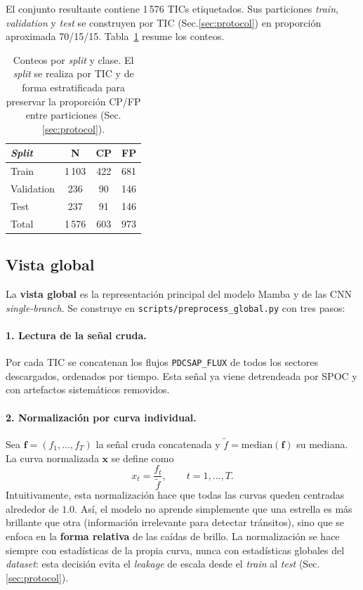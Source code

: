 \documentclass[11pt,a4paper]{article}
\begin{document}
El conjunto resultante contiene 1\,576 TICs etiquetados. Sus particiones
\textit{train}, \textit{validation} y \textit{test} se construyen por TIC
(Sec.\ref{sec:protocol}) en proporción aproximada 70/15/15.
Tabla~\ref{tab:dataset-counts} resume los conteos.

\begin{table}[H]
\centering
\caption{Conteos por \textit{split} y clase. El \textit{split} se
realiza por TIC y de forma estratificada para preservar la proporción
CP/FP entre particiones (Sec.\ref{sec:protocol}).}
\label{tab:dataset-counts}
\begin{tabular}{lccc}
\toprule
\textit{Split} & N & CP & FP \\
\midrule
Train      & 1\,103 & 422 & 681 \\
Validation & 236    & 90  & 146 \\
Test       & 237    & 91  & 146 \\
\midrule
Total      & 1\,576 & 603 & 973 \\
\bottomrule
\end{tabular}
\end{table}

\subsection{Vista global}
\label{subsec:global-view}

La \textbf{vista global} es la representación principal del modelo
Mamba y de las CNN \textit{single-branch}. Se construye en
\texttt{scripts/preprocess\_global.py} con tres pasos:

\paragraph{1. Lectura de la señal cruda.}
Por cada TIC se concatenan los flujos \texttt{PDCSAP\_FLUX} de todos
los sectores descargados, ordenados por tiempo. Esta señal ya viene
detrendeada por SPOC y con artefactos sistemáticos removidos.

\paragraph{2. Normalización por curva individual.}
Sea $\mathbf{f} = (f_1, \dots, f_T)$ la señal cruda concatenada y
$\tilde{f} = \mathrm{median}(\mathbf{f})$ su mediana. La curva
normalizada $\mathbf{x}$ se define como
\begin{equation}
  x_t = \frac{f_t}{\tilde{f}}, \qquad t = 1, \dots, T.
\label{eq:median-norm}
\end{equation}
Intuitivamente, esta normalización hace que todas las curvas queden
centradas alrededor de $1.0$. Así, el modelo no aprende simplemente
que una estrella es más brillante que otra (información irrelevante
para detectar tránsitos), sino que se enfoca en la \textbf{forma
relativa} de las caídas de brillo. La normalización se hace siempre
con estadísticas de la propia curva, nunca con estadísticas globales
del \textit{dataset}: esta decisión evita el \textit{leakage} de
escala desde el \textit{train} al \textit{test}
(Sec.\ref{sec:protocol}).
\end{document}
